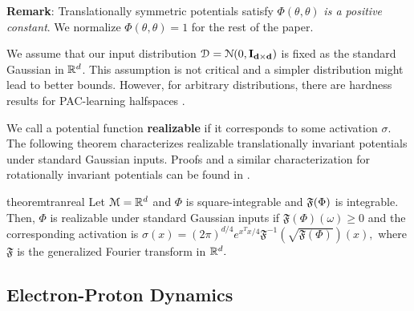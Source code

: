 {\bf Remark}: Translationally symmetric potentials satisfy
$\Phi(\theta,\theta)$ {\it is a positive constant}. We normalize
$\Phi(\theta,\theta) = 1$ for the rest of the paper.
  
We assume that our input distribution
$\mathcal{D} = \mathcal{N}(0, {\bf I_{d\times d}})$ is fixed as the
standard Gaussian in ${\mathbb{R}}^d$. This assumption is not critical and a
simpler distribution might lead to better bounds. However, for
arbitrary distributions, there are hardness results for PAC-learning
halfspaces \cite{klivans2006cryptographic}.

We call a potential function {\bf realizable} if it corresponds to
some activation $\sigma$.  The following theorem characterizes
realizable translationally invariant potentials under standard
Gaussian inputs. Proofs and a similar characterization for rotationally invariant
potentials can be found in .
%
\begin{restatable}{theorem}{tranreal}
\label{thm:tranReal}
Let $\mathcal{M} = {\mathbb{R}}^d$ and $\Phi$ is square-integrable and
${\mathfrak{F}}(\Phi)$ is integrable. Then, $\Phi$ is realizable under standard
Gaussian inputs if $\mathfrak{F}(\Phi)(\omega) \geq 0$ and the
corresponding activation is
$\sigma(x) =
(2\pi)^{d/4}e^{x^Tx/4}\mathfrak{F}^{-1}(\sqrt{\mathfrak{F}(\Phi)})(x),
$ where $\mathfrak{F}$ is the generalized Fourier transform in ${\mathbb{R}}^d.$
\end{restatable}
%

%
\subsection{Electron-Proton Dynamics}

%
%

